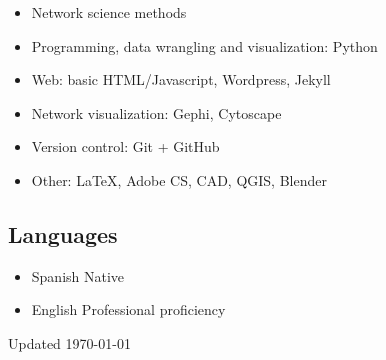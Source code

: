 \documentclass{academiccv}
\begin{document}
\begin{itemize}

\item Network science methods
\item Programming, data wrangling and visualization: Python
\item Web: basic HTML/Javascript, Wordpress, Jekyll
\item Network visualization: Gephi, Cytoscape
\item Version control: Git +  GitHub
\item Other: \LaTeX, Adobe CS, CAD, QGIS, Blender

\end{itemize}


\subsection*{Languages}

\begin{itemize}

\item Spanish \tab Native
\item English \tab Professional proficiency

\end{itemize}



\begin{center}
\vspace{6em}
Updated \monthyeardate\today
\end{center}
\end{document}
